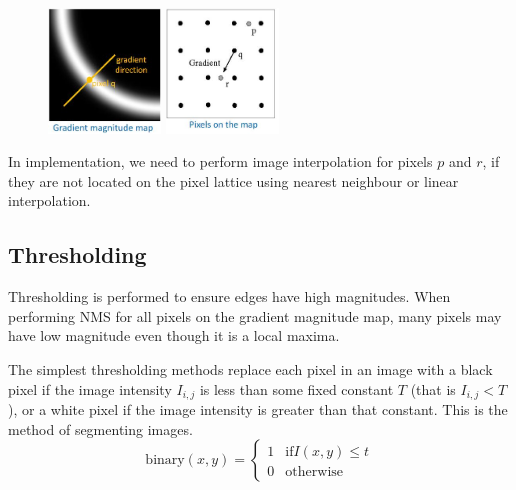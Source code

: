 \documentclass{report}
\begin{document}
\begin{figure}[h]
    \centering
    \includegraphics[width=3cm]{NMS_1.JPG}
    \hspace{1cm}
    \includegraphics[width=3cm]{NMS_2.JPG}
\end{figure}

In implementation, we need to perform image interpolation for pixels $p$ and
$r$, if they are not located on the pixel lattice using nearest neighbour or
linear interpolation.

\subsection{Thresholding}

Thresholding is performed to ensure edges have high magnitudes. When performing
NMS for all pixels on the gradient magnitude map, many pixels may have low
magnitude even though it is a local maxima. 

The simplest thresholding methods replace each pixel in an image with a black
pixel if the image intensity $I_{i,j}$ is less than some fixed constant $T$
(that is $I_{i,j} < T$), or a white pixel if the image intensity is greater than that
constant. This is the method of segmenting images. 
$$
    \text{binary}(x,y) = \begin{cases}
        1 & \text{if} I(x,y) \leq t \\
        0 & \text{otherwise}
    \end{cases}
$$
\end{document}

